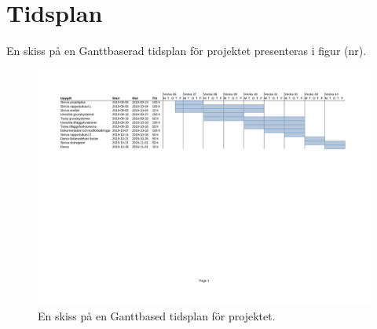 \documentclass[a4paper]{article}
\begin{document}
\section*{Tidsplan}

En skiss på en Ganttbaserad tidsplan för projektet presenteras i figur (nr). 

\begin{figure}[h]
  \centering
  \includegraphics[trim={2cm 12cm 2cm 0}, clip, scale=0.45]{figurer/tidsplan.pdf}
  \caption{En skiss på en Ganttbased tidsplan för projektet.}
\end{figure}
\end{document}
